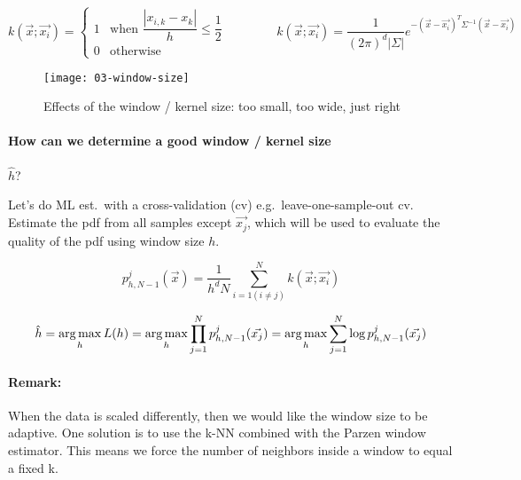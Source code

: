 \begin{equation*}
  k(\vec{x}; \vec{x_i}) = \begin{cases}
    1 &\text{when } \dfrac{|x_{i,k} - x_k|}{h} \le \dfrac{1}{2}\\
    0 &\text{otherwise}
  \end{cases}
  \qquad \qquad
  k(\vec{x}; \vec{x_i}) = \dfrac{1}{{(2\pi)}^d |\Sigma|} e^{-{(\vec{x} - \vec{x_i})}^T \Sigma^{-1}(\vec{x}-\vec{x_i})}
\end{equation*}

\begin{figure}[H]
  \centering
  \texttt{[image: 03-window-size]}
  \caption{Effects of the window / kernel size: too small, too wide, just right}
\end{figure}

\paragraph{How can we determine a good window / kernel size} $\hat{h}$?

Let's do ML est.\ with a cross-validation (cv) e.g.\ leave-one-sample-out cv. Estimate the pdf from all samples except $\vec{x_j}$, which will be used to evaluate the quality of the pdf using window size $h$.

\begin{equation*}
  p_{h,N-1}^j(\vec{x}) = \dfrac{1}{h^d N} \sum_{i=1 (i \neq j)}^N k(\vec{x}; \vec{x_i})
\end{equation*}

\begin{equation*}
  \hat{h} = \operatorname*{arg\,max}_h L(h) = \operatorname*{arg\,max}_h \prod_{j=1}^N p_{h,N-1}^j(\vec{x_j}) = \operatorname*{arg\,max}_h \sum_{j=1}^N \log p_{h,N-1}^j(\vec{x_j})
\end{equation*}

\paragraph{Remark:}
When the data is scaled differently, then we would like the window size to be adaptive. One solution is to use the k-NN combined with the Parzen window estimator. This means we force the number of neighbors inside a window to equal a fixed k.
